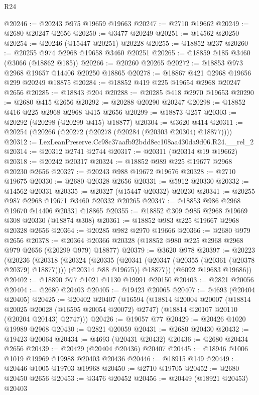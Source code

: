 \begin{lexlean}{R24}
\begin{coremodule}
@20246 := @20243 @975 @19659 @19663
@20247 := @2710 @19662
@20249 := @2680 @20247 @2656
@20250 := @3477 @20249
@20251 := @14562 @20250
@20254 := @20246 (@15447 @20251) @20228
@20255 := @18852 @237
@20260 := @20255 @974 @2968 @19658 @3460 @20251
@20265 := @18859 @185 @3460 (@3066 (@18862 @185))
@20266 := @20260 @20265
@20272 := @18853 @973 @2968 @19657 @14406 @20250 @18865
@20278 := @18867 @421 @2968 @19656 @299 @20249 @18875
@20284 := @18852 @419 @225 @19654 @2968 @20247 @2656
@20285 := @18843 @204
@20288 := @20285 @418 @2970 @19653
@20290 := @2680 @415 @2656
@20292 := @20288 @20290 @20247
@20298 := @18852 @416 @225 @2968 @2968 @415 @2656
@20299 := @18873 @257
@20303 := @20292 (@20298 (@20299 @415) @18877)
@20304 := @3620 @414
@20311 := @20254 (@20266 (@20272 (@20278 (@20284 (@20303 @20304) @18877))))
@20312 := LexLeanPreserve.Cc98c37aafb92bdd8ec108aa430da9d06.R24.__rel_2
@20314 := @20312 @2741 @2744
@20317 := @20311 (@20314 @19 @19662)
@20318 := @20242 @20317
@20324 := @18852 @989 @225 @19677 @2968 @20230 @2656
@20327 := @20243 @988 @19672 @19676
@20328 := @2710 @19675
@20330 := @2680 @20328 @2656
@20331 := @5912 @20330
@20332 := @14562 @20331
@20335 := @20327 (@15447 @20332) @20230
@20341 := @20255 @987 @2968 @19671 @3460 @20332 @20265
@20347 := @18853 @986 @2968 @19670 @14406 @20331 @18865
@20355 := @18852 @309 @985 @2968 @19669 @308 @20330 (@18874 @308)
@20361 := @18852 @983 @225 @19667 @2968 @20328 @2656
@20364 := @20285 @982 @2970 @19666
@20366 := @2680 @979 @2656
@20378 := @20364 @20366 @20328 (@18852 @980 @225 @2968 @2968 @979 @2656 (@20299 @979) @18877)
@20379 := @3620 @978
@20397 := @20223
    (@20236
      (@20318
        (@20324
          (@20335 (@20341 (@20347 (@20355 (@20361 (@20378 @20379) @18877)))) (@20314 @88 @19675))
          @18877))
      (@6092 @19683 @19686))
@20402 := @18890 @77 @1021 @1130 @19991 @20150
@20403 := @2821 @20056
@20404 := @2680 @20403
@20405 := @19423 @20065
@20407 := @4693 (@20404 @20405)
@20425 := @20402
    @20407
    (@16594
      (@18814
        @20004
        @20007
        (@18814 @20025 @20028 (@16595 @20054 @20072) @2747)
        (@18814 @20107 @20110 (@20204 @20143) @2747)))
@20426 := @19057 @77
@20429 := @20426 @1020 @19989 @2968
@20430 := @2821 @20059
@20431 := @2680 @20430
@20432 := @19423 @20064
@20434 := @4693 (@20431 @20432)
@20436 := @2680 @20434 @2656
@20439 := @20429 (@20404 @20436) @20407
@20445 := @18946 @1006 @1019 @19969 @19988 @20403 @20436
@20446 := @18915 @149
@20449 := @20446 @1005 @19703 @19968
@20450 := @2710 @19705
@20452 := @2680 @20450 @2656
@20453 := @3476 @20452
@20456 := @20449 (@18921 @20453) @20403

\end{coremodule}
\end{lexlean}
